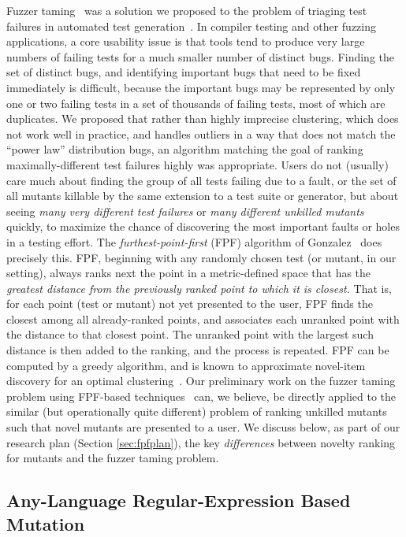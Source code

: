 Fuzzer taming~\cite{PLDI13} was a solution we proposed to the problem
of triaging test failures in automated test generation~\cite{SemCrash}.  In compiler
testing and other fuzzing applications, a core usability issue is that
tools tend to produce very large numbers of failing tests for a much
smaller number of distinct bugs.  Finding the set of distinct bugs,
and identifying important bugs that need to be fixed immediately is
difficult, because the important bugs may be represented by only one
or two failing tests in a set of thousands of failing tests, most of
which are duplicates.  We proposed that rather than highly imprecise
clustering, which does not work well in practice, and handles outliers
in a way that does not match the ``power law'' distribution bugs, an
algorithm matching the goal of ranking maximally-different test
failures highly was appropriate.  Users do not (usually) care much
about finding the group of all tests failing due to a fault, or the
set of all mutants killable by the same extension to a test suite or
generator, but about seeing \emph{many very different test failures} or \emph{many
  different unkilled mutants} quickly, to maximize the chance of
discovering the most important faults or holes in a testing effort.
The \emph{furthest-point-first} (FPF) algorithm of
Gonzalez~\cite{Gonzalez85} does precisely this.  FPF, beginning with
any randomly chosen test (or mutant, in our setting), always ranks
next the point in a metric-defined space that has the \emph{greatest
  distance from the previously ranked point to which it is closest.}
That is, for each point (test or mutant) not yet presented to the
user, FPF finds the closest among all already-ranked points, and
associates each unranked point with the distance to that closest
point.  The unranked point with the largest such distance is then
added to the ranking, and the process is repeated.  FPF can be
computed by a greedy algorithm, and is known to approximate novel-item
discovery for an optimal clustering~\cite{Gonzalez85}.  Our
preliminary work on the fuzzer taming problem using FPF-based
techniques~\cite{PLDI13,distMut} can, we believe, be directly applied
to the similar (but operationally quite different) problem of ranking
unkilled mutants such that novel mutants are presented to a user.  We
discuss below, as part of our research plan (Section
\ref{sec:fpfplan}), the key \emph{differences} between novelty ranking
for mutants and
the fuzzer taming problem.

\subsection{Any-Language Regular-Expression Based Mutation}